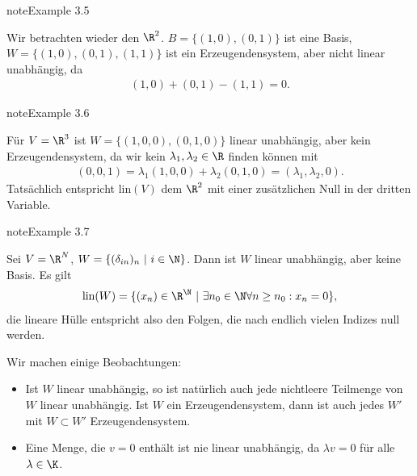 \documentclass[letterpaper,10pt,english]{jupyterBook}
\begin{document}
\label{vektorraeume/vektorraeume:example-6}
\begin{sphinxadmonition}{note}{Example 3.5}



Wir betrachten wieder den \(\R^2\). \(B=\{(1,0),(0,1)\}\) ist eine Basis, \(W= \{(1,0),(0,1),(1,1)\}\) ist ein Erzeugendensystem, aber nicht linear unabhängig, da
\begin{equation*}
\begin{split} (1,0) + (0,1) - (1,1) = 0.\end{split}
\end{equation*}\end{sphinxadmonition}
\label{vektorraeume/vektorraeume:example-7}
\begin{sphinxadmonition}{note}{Example 3.6}



Für \(V=\R^3\) ist \(W=\{(1,0,0),(0,1,0)\}\)  linear unabhängig, aber kein Erzeugendensystem, da wir kein \(\lambda_1,\lambda_2 \in \R\) finden können mit
\begin{equation*}
\begin{split}(0,0,1) =  \lambda_1 (1,0,0)+ \lambda_2 (0,1,0) = (\lambda_1,\lambda_2,0).\end{split}
\end{equation*}
Tatsächlich entspricht lin\((V)\) dem \(\R^2\) mit einer zusätzlichen Null in der dritten Variable.
\end{sphinxadmonition}
\label{vektorraeume/vektorraeume:example-8}
\begin{sphinxadmonition}{note}{Example 3.7}



Sei \(V=\R^N\), \(W=\{(\delta_{in})_n ~|~i \in \N\}\). Dann ist \(W\) linear unabhängig, aber keine Basis. Es gilt
\begin{equation*}
\begin{split} \text{lin}(W) = \{ (x_n) \in \R^\N~|~ \exists n_0 \in \N \forall n \geq n_0: x_n =0 \},\end{split}
\end{equation*}
die lineare Hülle entspricht also den Folgen, die nach endlich vielen Indizes null werden.
\end{sphinxadmonition}

Wir machen einige Beobachtungen:
\begin{itemize}
\item {} 
Ist \(W\) linear unabhängig, so ist natürlich auch jede nichtleere Teilmenge von \(W\) linear unabhängig. Ist \(W\) ein Erzeugendensystem, dann ist auch jedes \(W'\) mit \(W \subset W'\) Erzeugendensystem.

\item {} 
Eine Menge, die \(v=0\) enthält ist nie linear unabhängig, da \(\lambda   v  = 0\) für alle \(\lambda \in \K\).

\end{itemize}
\end{document}
